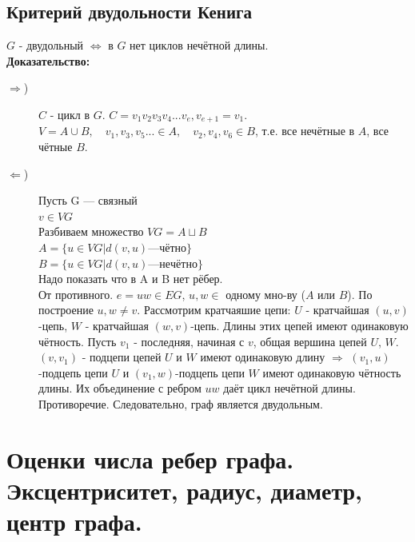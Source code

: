\documentclass[12pt]{article}
\begin{document}
\subsection{Критерий двудольности Кенига}
	$G$ - двудольный $\Leftrightarrow$ в $G$ нет циклов нечётной длины.\\
	\textbf{Доказательство:}
		\begin{description}
			\item[$ \Rightarrow $)] $C$ - цикл в $G$. $C = v_1v_2v_3v_4...v_e,v_{e+1}=v_1$. $V = A \cup B, \quad v_1,v_3,v_5... \in A, \quad v_2,v_4,v_6 \in B$,
				т.е. все нечётные в $A$, все чётные $B$.
			\item[$\Leftarrow$)] Пусть G — связный\\
			$v \in VG$\\
			Разбиваем множество $VG = A \sqcup B$\\
			$A = \{u \in VG | d(v,u) — чётно\}$\\
			$B = \{u \in VG | d(v,u) — нечётно\}$\\
			Надо показать что в A и B нет рёбер.\\
			От противного. $e = uw \in EG$, $u, w \in$ одному мно-ву ($A$ или $B$). По построение $u, w \ne v$. Рассмотрим кратчаяшие цепи:
				$U$ - кратчайшая $(u,v)$-цепь, $W$ - кратчайшая $(w,v)$-цепь. Длины этих цепей имеют одинаковую чётность. Пусть $v_1$ - последняя, начиная с $v$,
				общая вершина цепей $U$, $W$.\\
				$(v, v_1)$ - подцепи цепей $U$ и $W$ имеют одинаковую длину $\Rightarrow$ $(v_1, u)$-подцепь цепи $U$ и $(v_1, w)$-подцепь цепи $W$ имеют одинаковую чётность длины. Их объединение с ребром $uw$ даёт цикл нечётной длины. Противоречие. Следовательно, граф является двудольным.
		\end{description}
	\qedsymbol

\section{Оценки числа ребер графа. Эксцентриситет, радиус, диаметр, центр графа.}
\end{document}
